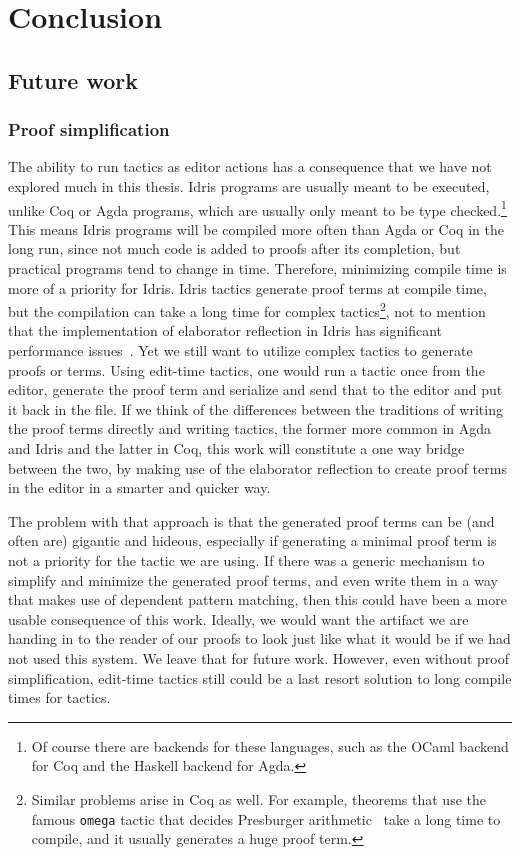 \chapter{Conclusion}\label{chap:conclusion}

\section{Future work}

\subsection{Proof simplification}

The ability to run tactics as editor actions has a consequence
that we have not explored much in this thesis.
Idris programs are usually meant to be executed, unlike Coq or
Agda programs, which are usually only meant to be type checked.\footnote{Of
  course there are backends for these languages, such as the OCaml
  backend for Coq and the Haskell backend for Agda.}
This means Idris programs will be compiled more often than Agda or Coq in the
long run, since not much code is added to proofs after its completion, but
practical programs tend to change in time. Therefore, minimizing compile time
is more of a priority for Idris.
Idris tactics generate proof terms at compile time, but the
compilation can take a long time for complex tactics\footnote{Similar problems
arise in Coq as well. For example, theorems that use the famous \texttt{omega}
tactic that decides Presburger arithmetic~\cite{omega} take a long time to compile, and it
usually generates a huge proof term.},
not to mention that the implementation of elaborator
reflection in Idris has significant performance issues~\cite{leanmeta}.
Yet we still want to utilize complex tactics to generate proofs or terms.
Using edit-time tactics, one would run a tactic once from the editor, generate
the proof term and serialize and send that to the editor and put it back in the
file.
If we think of the differences between the traditions of writing the proof
terms directly and writing tactics, the former more common in Agda and Idris
and the latter in Coq, this work will constitute a one way bridge
between the two, by making use of the elaborator reflection to create proof
terms in the editor in a smarter and quicker way.

The problem with that approach is that the generated proof terms can be (and
often are) gigantic and hideous, especially if generating a minimal proof term
is not a priority for the tactic we are using.
If there was a generic mechanism to simplify and minimize the generated proof
terms, and even write them in a way that makes use of dependent pattern
matching, then this could have been a more usable consequence of this work.
Ideally, we would want the artifact we are handing in to the reader of our
proofs to look just like what it would be if we had not used this system.
We leave that for future work.  However, even without proof simplification,
edit-time tactics still could be a last resort solution to long compile times
for tactics.

